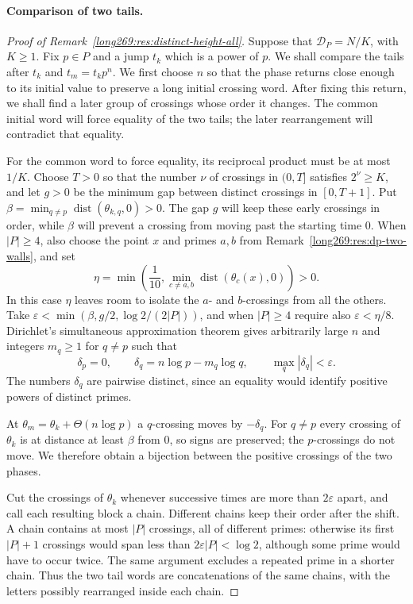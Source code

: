 \documentclass[11pt]{article}
\theoremstyle{remark}
\theoremstyle{plain}
\begin{document}
\paragraph{Comparison of two tails.}\label{long269:sec:tail-comparison}
\begin{proof}[Proof of Remark~\ref{long269:res:distinct-height-all}]
Suppose that $\mathcal D_P=N/K$, with $K\ge1$. Fix $p\in P$ and a jump
$t_k$ which is a power of $p$. We shall compare the tails after $t_k$ and
$t_m=t_kp^n$. We first choose $n$ so that the phase returns close enough
to its initial value to preserve a long initial crossing word. After
fixing this return, we
shall find a later group of crossings whose order it changes. The
common initial word will force equality of the two tails; the later
rearrangement will contradict that equality.

For the common word to force equality, its reciprocal product must be
at most $1/K$. Choose $T>0$ so that the number $\nu$ of crossings in
$(0,T]$ satisfies $2^\nu\ge K$, and let $g>0$ be the minimum gap between
distinct crossings in $[0,T+1]$. Put
$\beta=\min_{q\ne p}\operatorname{dist}(\theta_{k,q},0)>0$.
The gap $g$ will keep these early crossings in order, while $\beta$
will prevent a crossing from moving past the starting time $0$.
When $|P|\ge4$, also choose the point $x$ and primes $a,b$ from
Remark~\ref{long269:res:dp-two-walls}, and set
\[
 \eta=\min\left(\frac1{10},
       \min_{c\ne a,b}\operatorname{dist}(\theta_c(x),0)\right)>0.
\]
In this case $\eta$ leaves room to isolate the $a$- and $b$-crossings
from all the others. Take $\varepsilon<\min(\beta,g/2,\log2/(2|P|))$, and when
$|P|\ge4$ require also $\varepsilon<\eta/8$. Dirichlet's simultaneous
approximation theorem gives arbitrarily large $n$ and integers $m_q\ge1$
for $q\ne p$ such that
\[
 \delta_p=0,\qquad \delta_q=n\log p-m_q\log q,\qquad
 \max_q|\delta_q|<\varepsilon.
\]
The numbers $\delta_q$ are pairwise distinct, since an equality would
identify positive powers of distinct primes.

At $\theta_m=\theta_k+\Theta(n\log p)$ a $q$-crossing moves by
$-\delta_q$. For $q\ne p$ every crossing of $\theta_k$ is at distance at
least $\beta$ from $0$, so signs are preserved; the $p$-crossings do not
move. We therefore obtain a bijection between the positive crossings of
the two phases.

Cut the crossings of $\theta_k$ whenever successive times are more than
$2\varepsilon$ apart, and call each resulting block a chain. Different
chains keep their order after the shift. A chain contains at most $|P|$
crossings, all of different primes: otherwise its first $|P|+1$ crossings
would span less than $2\varepsilon|P|<\log2$, although some prime would
have to occur twice. The same argument excludes a repeated prime in a
shorter chain. Thus the two tail words are concatenations of the same
chains, with the letters possibly rearranged inside each chain.


\end{proof}
\end{document}
